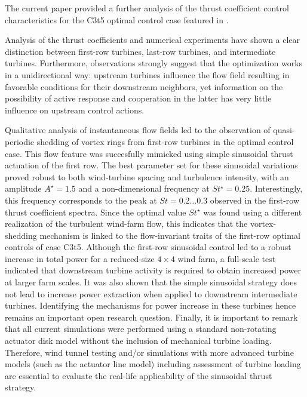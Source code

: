 \documentclass[wes, manuscript]{copernicus}
\begin{document}
\conclusions \label{sec:analysis_summ}
The current paper provided a further analysis of the thrust coefficient control characteristics for the C3t5 optimal control case featured in \cite{munters2017optimal}. 

Analysis of the thrust coefficients and numerical experiments have shown a clear distinction between first-row turbines, last-row turbines, and intermediate turbines. Furthermore, observations strongly suggest that the optimization works in a unidirectional way: upstream turbines influence the flow field resulting in favorable conditions for their downstream neighbors, yet information on the possibility of active response and cooperation in the latter has very little influence on upstream control actions. 

Qualitative analysis of instantaneous flow fields led to the observation of quasi-periodic shedding of vortex rings from first-row turbines in the optimal control case. This flow feature was succesfully mimicked using simple sinusoidal thrust actuation of the first row. The best parameter set for these sinusoidal variations proved robust to both wind-turbine spacing and turbulence intensity, with an amplitude $A^\star = 1.5$ and a non-dimensional frequency at $St^\star = 0.25$. Interestingly, this frequency corresponds to the peak at $St = 0.2 \dots 0.3$ observed in the first-row thrust coefficient spectra. Since the optimal value $St^\star$ was found using a different realization of the turbulent wind-farm flow, this indicates that the vortex-shedding mechanism is linked to the flow-invariant traits of the first-row optimal controls of case C3t5. Although the first-row sinusoidal control led to a robust increase in total power for a reduced-size $4\times4$ wind farm, a full-scale test indicated that downstream turbine activity is required to obtain increased power at larger farm scales. It was also shown that the simple sinusoidal strategy does not lead to increase power extraction when applied to downstream intermediate turbines. Identifying the mechanisms for power increase in these turbines hence remains an important open research question. Finally, it is important to remark that all current simulations were performed using a standard non-rotating actuator disk model without the inclusion of mechanical turbine loading. Therefore, wind tunnel testing and/or simulations with more advanced turbine models (such as the actuator line model) including assessment of turbine loading are essential to evaluate the real-life applicability of the sinusoidal thrust strategy. 
\end{document}
